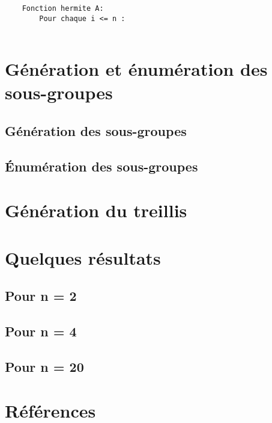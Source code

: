 \documentclass[11pt]{article}
\begin{document}
\begin{verbatim}
	Fonction hermite A:
	    Pour chaque i <= n :


\end{verbatim}

\section {Génération et énumération des sous-groupes}
\subsection{Génération des sous-groupes}
\subsection{Énumération des sous-groupes}

\section{Génération du treillis}

\section {Quelques résultats}
\subsection{Pour n = 2}
\subsection{Pour n = 4}
\subsection{Pour n = 20}


\section{Références}
\end{document}
